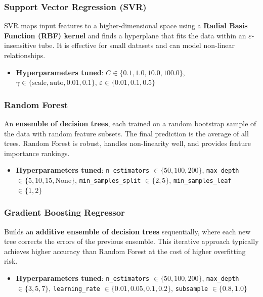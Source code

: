 \documentclass[12pt, a4paper]{article}
\begin{document}
\subsubsection{Support Vector Regression (SVR)}
\label{sec:svr}

SVR maps input features to a higher-dimensional space using a \textbf{Radial Basis Function (RBF) kernel} and finds a hyperplane that fits the data within an $\varepsilon$-insensitive tube. It is effective for small datasets and can model non-linear relationships.

\begin{itemize}
    \item \textbf{Hyperparameters tuned}: $C \in \{0.1, 1.0, 10.0, 100.0\}$, $\gamma \in \{\text{scale}, \text{auto}, 0.01, 0.1\}$, $\varepsilon \in \{0.01, 0.1, 0.5\}$
\end{itemize}

\subsubsection{Random Forest}
\label{sec:random-forest}

An \textbf{ensemble of decision trees}, each trained on a random bootstrap sample of the data with random feature subsets. The final prediction is the average of all trees. Random Forest is robust, handles non-linearity well, and provides feature importance rankings.

\begin{itemize}
    \item \textbf{Hyperparameters tuned}: \texttt{n\_estimators} $\in \{50, 100, 200\}$, \texttt{max\_depth} $\in \{5, 10, 15, \text{None}\}$, \texttt{min\_samples\_split} $\in \{2, 5\}$, \texttt{min\_samples\_leaf} $\in \{1, 2\}$
\end{itemize}

\subsubsection{Gradient Boosting Regressor}
\label{sec:gradient-boosting}

Builds an \textbf{additive ensemble of decision trees} sequentially, where each new tree corrects the errors of the previous ensemble. This iterative approach typically achieves higher accuracy than Random Forest at the cost of higher overfitting risk.

\begin{itemize}
    \item \textbf{Hyperparameters tuned}: \texttt{n\_estimators} $\in \{50, 100, 200\}$, \texttt{max\_depth} $\in \{3, 5, 7\}$, \texttt{learning\_rate} $\in \{0.01, 0.05, 0.1, 0.2\}$, \texttt{subsample} $\in \{0.8, 1.0\}$
\end{itemize}
\end{document}
